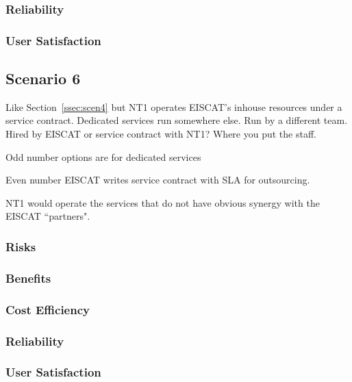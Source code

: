\documentclass[12pt,a4paper]{article}
\begin{document}
\subsubsection*{Reliability}
\bitm
\item 
\eitm

\subsubsection*{User Satisfaction}
\bitm
\item 
\eitm

\subsection{Scenario 6}
\label{ssec:scen6}

Like Section~\ref{ssec:scen4} but NT1 operates EISCAT's inhouse resources under a service contract.
Dedicated services run somewhere else.
Run by a different team.
Hired by EISCAT or service contract with NT1?
Where you put the staff.

Odd number options are for dedicated services

Even number EISCAT writes service contract with SLA for outsourcing.

NT1 would operate the services that do not have obvious synergy with the EISCAT ``partners".

\subsubsection*{Risks}
\bitm
\item 
\eitm

\subsubsection*{Benefits}
\bitm
\item 
\eitm

\subsubsection*{Cost Efficiency}
\bitm
\item 
\eitm

\subsubsection*{Reliability}
\bitm
\item 
\eitm

\subsubsection*{User Satisfaction}
\bitm
\item 
\eitm
\newpage
{}

\end{document}
